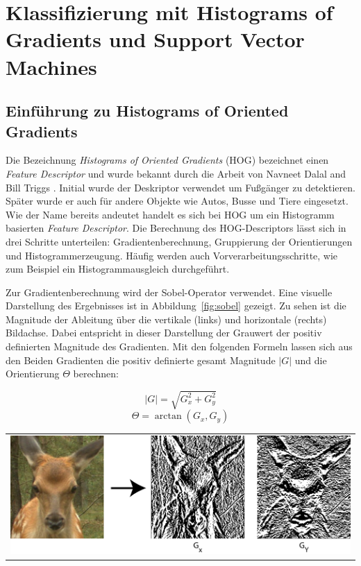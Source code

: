 \newpage
\section{Klassifizierung mit Histograms of Gradients und Support Vector Machines} \label{sec:HOG}


\subsection{Einführung zu Histograms of Oriented Gradients}

Die Bezeichnung \textit{Histograms of Oriented Gradients} (HOG) bezeichnet einen \textit{Feature Descriptor} und wurde bekannt durch die Arbeit von Navneet Dalal and Bill Triggs \cite{dalal05}. Initial wurde der Deskriptor verwendet um Fußgänger zu detektieren. Später wurde er auch für andere Objekte wie Autos, Busse und Tiere eingesetzt. Wie der Name bereits andeutet handelt es sich bei HOG um ein Histogramm basierten \textit{Feature Descriptor}. Die Berechnung des HOG-Descriptors lässt sich in drei Schritte unterteilen: Gradientenberechnung, Gruppierung der Orientierungen und Histogrammerzeugung. Häufig werden  auch Vorverarbeitungsschritte, wie zum Beispiel ein Histogrammausgleich durchgeführt.

Zur Gradientenberechnung wird der Sobel-Operator verwendet. Eine visuelle Darstellung des Ergebnisses ist in Abbildung~\ref{fig:sobel} gezeigt. Zu sehen ist die Magnitude der Ableitung über die vertikale (links) und horizontale (rechts) Bildachse. Dabei entspricht in dieser Darstellung der Grauwert der positiv definierten Magnitude des Gradienten. Mit den folgenden Formeln lassen sich aus den Beiden Gradienten die positiv definierte gesamt Magnitude $|G|$ und die Orientierung $\Theta$ berechnen:  

\begin{equation}
|G| = \sqrt{G_x^2 + G_y^2}
\end{equation}
\begin{equation}
\Theta = \arctan({G_x, G_y})
\end{equation}

\begin{center}
\begin{tabular}{c}
\includegraphics[trim={0 0cm 0cm 0cm},clip=true,width=13cm]{img/sobel.png}
\end{tabular}
\label{fig:sobel}
\end{center}

